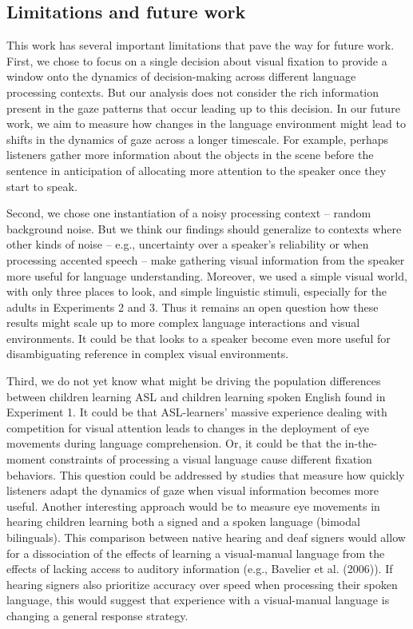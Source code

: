 \documentclass[english,floatsintext,man]{apa6}
\begin{document}
\hypertarget{limitations-and-future-work}{%
\subsection{Limitations and future
work}\label{limitations-and-future-work}}

This work has several important limitations that pave the way for future
work. First, we chose to focus on a single decision about visual
fixation to provide a window onto the dynamics of decision-making across
different language processing contexts. But our analysis does not
consider the rich information present in the gaze patterns that occur
leading up to this decision. In our future work, we aim to measure how
changes in the language environment might lead to shifts in the dynamics
of gaze across a longer timescale. For example, perhaps listeners gather
more information about the objects in the scene before the sentence in
anticipation of allocating more attention to the speaker once they start
to speak.

Second, we chose one instantiation of a noisy processing context --
random background noise. But we think our findings should generalize to
contexts where other kinds of noise -- e.g., uncertainty over a
speaker's reliability or when processing accented speech -- make
gathering visual information from the speaker more useful for language
understanding. Moreover, we used a simple visual world, with only three
places to look, and simple linguistic stimuli, especially for the adults
in Experiments 2 and 3. Thus it remains an open question how these
results might scale up to more complex language interactions and visual
environments. It could be that looks to a speaker become even more
useful for disambiguating reference in complex visual environments.

Third, we do not yet know what might be driving the population
differences between children learning ASL and children learning spoken
English found in Experiment 1. It could be that ASL-learners' massive
experience dealing with competition for visual attention leads to
changes in the deployment of eye movements during language
comprehension. Or, it could be that the in-the-moment constraints of
processing a visual language cause different fixation behaviors. This
question could be addressed by studies that measure how quickly
listeners adapt the dynamics of gaze when visual information becomes
more useful. Another interesting approach would be to measure eye
movements in hearing children learning both a signed and a spoken
language (bimodal bilinguals). This comparison between native hearing
and deaf signers would allow for a dissociation of the effects of
learning a visual-manual language from the effects of lacking access to
auditory information (e.g., Bavelier et al. (2006)). If hearing signers
also prioritize accuracy over speed when processing their spoken
language, this would suggest that experience with a visual-manual
language is changing a general response strategy.
\end{document}
